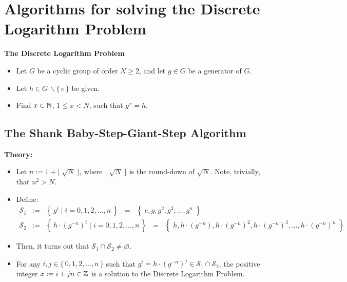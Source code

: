 
\section{Algorithms for solving the Discrete Logarithm Problem}
\setcounter{theorem}{0}
\setcounter{equation}{0}

\vskip 1.0cm
\begin{center}
\begin{minipage}{0.75\textwidth}
	\begin{center}\textbf{The Discrete Logarithm Problem}\end{center}
	\begin{itemize}
	\item	Let $G$ be a cyclic group of order $N \geq 2$, and let $g \in G$ be a generator of $G$.
	\item	Let $h \in G\,\backslash \{\,e\,\}$ be given.
	\item	Find $x \in \mathbb{N}$, $1 \leq x < N$, such that $g^{x} = h$.
	\end{itemize}
\end{minipage}
\end{center}
\vskip 1.0cm

\subsection{The Shank Baby-Step-Giant-Step Algorithm}

\noindent
\textbf{Theory:}
\begin{itemize}
\item	Let $n := 1 + \lfloor\,\sqrt{N}\,\rfloor$, where $\lfloor\,\sqrt{N}\,\rfloor$ is the round-down of $\sqrt{N}$.
		Note, trivially, that $n^{2} > N$.
\item	Define:
		\begin{eqnarray*}
		\mathcal{S}_{1} & := & \left\{\,g^{i}\;\vert\;i = 0,1,2,\ldots,n\,\right\}\;\;=\;\;\left\{\;e, g, g^{2}, g^{3}, \ldots, g^{n}\;\right\} \\
		\mathcal{S}_{2} & := & \left\{\,h\cdot(g^{-n})^{i}\;\vert\;i = 0,1,2,\ldots,n\,\right\}\;\;=\;\;\left\{\;h, h\cdot(g^{-n}), h\cdot(g^{-n})^{2}, h\cdot(g^{-n})^{3}, \ldots, h\cdot(g^{-n})^{n}\;\right\}
		\end{eqnarray*}
\item	Then, it turns out that $\mathcal{S}_{1}\cap\mathcal{S}_{2} \neq \varnothing$.
\item	For any $i, j \in \{\,0,1,2,\ldots,n\,\}$ such that $g^{i} = h\cdot(g^{-n})^{j} \in \mathcal{S}_{1}\cap\mathcal{S}_{2}$,
		the positive integer $x := i + jn \in \mathbb{Z}$ is a solution to the Discrete Logarithm Problem.
\end{itemize}

